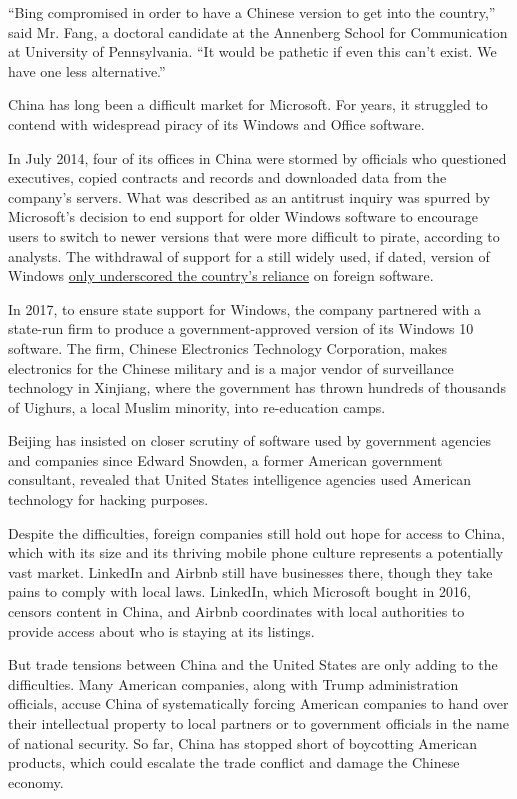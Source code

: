 ``Bing compromised in order to have a Chinese version to get into the
country,'' said Mr. Fang, a doctoral candidate at the Annenberg School
for Communication at University of Pennsylvania. ``It would be pathetic
if even this can't exist. We have one less alternative.''

China has long been a difficult market for Microsoft. For years, it
struggled to contend with widespread piracy of its Windows and Office
software.

In July 2014, four of its offices in China were stormed by officials who
questioned executives, copied contracts and records and downloaded data
from the company's servers. What was described as an antitrust inquiry
was spurred by Microsoft's decision to end support for older Windows
software to encourage users to switch to newer versions that were more
difficult to pirate, according to analysts. The withdrawal of support
for a still widely used, if dated, version of Windows
\href{https://www.nytimes.com/2016/01/06/business/international/microsoft-china-antitrust-inquiry.html}{only
underscored the country's reliance} on foreign software.

In 2017, to ensure state support for Windows, the company partnered with
a state-run firm to produce a government-approved version of its Windows
10 software. The firm, Chinese Electronics Technology Corporation, makes
electronics for the Chinese military and is a major vendor of
surveillance technology in Xinjiang, where the government has thrown
hundreds of thousands of Uighurs, a local Muslim minority, into
re-education camps.

Beijing has insisted on closer scrutiny of software used by government
agencies and companies since Edward Snowden, a former American
government consultant, revealed that United States intelligence agencies
used American technology for hacking purposes.

Despite the difficulties, foreign companies still hold out hope for
access to China, which with its size and its thriving mobile phone
culture represents a potentially vast market. LinkedIn and Airbnb still
have businesses there, though they take pains to comply with local laws.
LinkedIn, which Microsoft bought in 2016, censors content in China, and
Airbnb coordinates with local authorities to provide access about who is
staying at its listings.

But trade tensions between China and the United States are only adding
to the difficulties. Many American companies, along with Trump
administration officials, accuse China of systematically forcing
American companies to hand over their intellectual property to local
partners or to government officials in the name of national security. So
far, China has stopped short of boycotting American products, which
could escalate the trade conflict and damage the Chinese economy.


